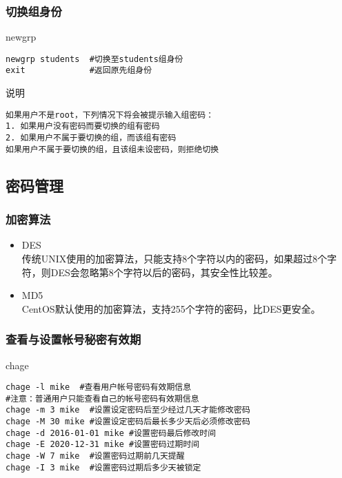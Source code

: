 \documentclass[xcolor=svgnames,presentation]{beamer}
\begin{document}
\begin{frame}[fragile]
\frametitle{切换组身份}
\label{sec-1-4-4}
\begin{exampleblock}{newgrp}
\label{sec-1-4-4-1}


\begin{verbatim}
newgrp students  #切换至students组身份
exit             #返回原先组身份
\end{verbatim}
\end{exampleblock}
\begin{block}{说明}
\label{sec-1-4-4-2}


\begin{verbatim}
如果用户不是root，下列情况下将会被提示输入组密码：
1. 如果用户没有密码而要切换的组有密码
2. 如果用户不属于要切换的组，而该组有密码
如果用户不属于要切换的组，且该组未设密码，则拒绝切换
\end{verbatim}
\end{block}
\end{frame}
\subsection{密码管理}
\label{sec-1-5}
\begin{frame}
\frametitle{加密算法}
\label{sec-1-5-1}
\begin{itemize}

\item DES\\
\label{sec-1-5-1-1}%
传统UNIX使用的加密算法，只能支持8个字符以内的密码，如果超过8个字符，则DES会忽略第8个字符以后的密码，其安全性比较差。

\item MD5\\
\label{sec-1-5-1-2}%
CentOS默认使用的加密算法，支持255个字符的密码，比DES更安全。
\end{itemize} %
\end{frame}
\begin{frame}[fragile]
\frametitle{查看与设置帐号秘密有效期}
\label{sec-1-5-2}
\begin{exampleblock}{chage}
\label{sec-1-5-2-1}


\begin{verbatim}
chage -l mike  #查看用户帐号密码有效期信息
#注意：普通用户只能查看自己的帐号密码有效期信息
chage -m 3 mike  #设置设定密码后至少经过几天才能修改密码
chage -M 30 mike #设置设定密码后最长多少天后必须修改密码
chage -d 2016-01-01 mike #设置密码最后修改时间
chage -E 2020-12-31 mike #设置密码过期时间
chage -W 7 mike  #设置密码过期前几天提醒
chage -I 3 mike  #设置密码过期后多少天被锁定
\end{verbatim}
\end{exampleblock}
\end{frame}
\end{document}

